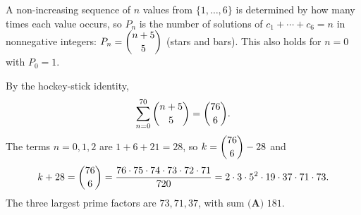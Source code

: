 A non-increasing sequence of $n$ values from $\{1,\dots,6\}$ is determined by how many times each value occurs, so $P_n$ is the number of solutions of $c_1+\cdots+c_6=n$ in nonnegative integers: $P_n=\dbinom{n+5}{5}$ (stars and bars). This also holds for $n=0$ with $P_0=1$.

By the hockey-stick identity,
\[
\sum_{n=0}^{70}\dbinom{n+5}{5}=\dbinom{76}{6}.
\]
The terms $n=0,1,2$ are $1+6+21=28$, so $k=\dbinom{76}{6}-28$ and
\[
k+28=\dbinom{76}{6}=\dfrac{76\cdot75\cdot74\cdot73\cdot72\cdot71}{720}=2\cdot3\cdot5^2\cdot19\cdot37\cdot71\cdot73 .
\]
The three largest prime factors are $73,71,37$, with sum $\boxed{\textbf{(A) }181}$.

